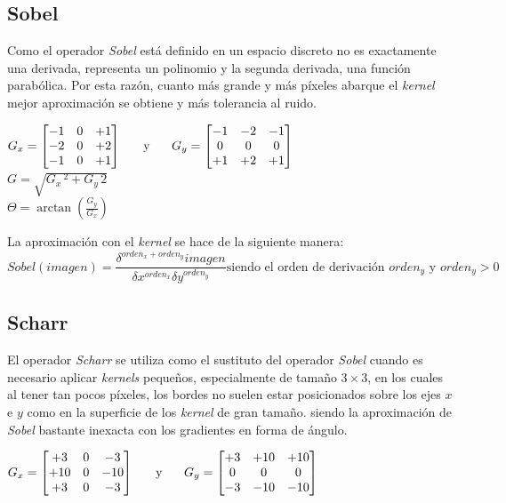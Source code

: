 \subsection{Sobel}
Como el operador \emph{Sobel} está definido en un espacio discreto no
es exactamente una derivada, representa un polinomio y la segunda
derivada, una función parabólica. Por esta razón, cuanto más grande y
más píxeles abarque el \emph{kernel} mejor aproximación se obtiene y
más tolerancia al ruido.
\begin{center}
  $ G_x = \begin{bmatrix}
    -1 & 0 & +1 \\
    -2 & 0 & +2 \\
    -1 & 0 & +1 \\
  \end{bmatrix}
  \hspace{0.5cm} \text{ y } \hspace{0.5cm} G_y = \begin{bmatrix}
    -1 & -2 & -1 \\
    0 & 0 & 0 \\
    +1 & +2 & +1 \\
  \end{bmatrix}
  $
  \\[0.5cm]
  $G = \sqrt{G_x\,^2 + G_y\,{2}}$
  \\[0.5cm]
  $\Theta= \arctan\left(\frac{G_y}{G_x} \right)$
\end{center}
La aproximación con el \emph{kernel} se hace de la siguiente manera:
\begin{equation*}
  Sobel(imagen) = \frac{\delta^{orden_x + orden_y} imagen}{\delta x^{orden_x} \delta
    y^{orden_y}} \text{siendo el orden de derivación } orden_y \text{ y } orden_y > 0
\end{equation*}

\subsection{Scharr}
El operador \emph{Scharr} se utiliza como el sustituto del operador
\emph{Sobel} cuando es necesario aplicar \emph{kernels} pequeños,
especialmente de tamaño $3 \times 3$, en los cuales al tener tan pocos
píxeles, los bordes no suelen estar posicionados sobre los ejes $x$ e
$y$ como en la superficie de los \emph{kernel} de gran tamaño. siendo
la aproximación de \emph{Sobel} bastante inexacta con los gradientes
en forma de ángulo.
\begin{center}
  $ G_x = \begin{bmatrix}
    +3 & 0 & -3 \\
    +10 & 0 & -10 \\
    +3 & 0 & -3 \\
  \end{bmatrix}
  \hspace{0.5cm} \text{ y } \hspace{0.5cm} G_y = \begin{bmatrix}
    +3 & +10 & +10 \\
    0 & 0 & 0 \\
    -3 & -10 & -10 \\
  \end{bmatrix}
  $
\end{center}
